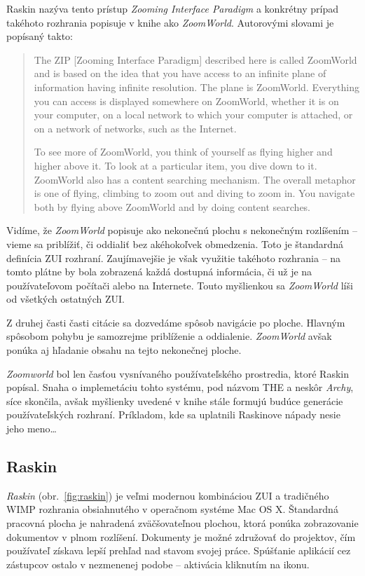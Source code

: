 Raskin nazýva tento prístup \textit{Zooming Interface Paradigm} a konkrétny prípad takéhoto rozhrania popisuje v knihe ako \textit{ZoomWorld}. Autorovými slovami je popísaný takto:

\begin{quotation}
The ZIP [Zooming Interface Paradigm] described here is called ZoomWorld and is based on the idea that you have access to an infinite plane of information having infinite resolution. The plane is ZoomWorld. Everything you can access is displayed somewhere on ZoomWorld, whether it is on your computer, on a local network to which your computer is attached, or on a network of networks, such as the Internet.

To see more of ZoomWorld, you think of yourself as flying higher and higher above it. To look at a particular item, you dive down to it. ZoomWorld also has a content searching mechanism. The overall metaphor is one of flying, climbing to zoom out and diving to zoom in. You navigate both by flying above ZoomWorld and by doing content searches.
\end{quotation}

Vidíme, že \textit{ZoomWorld} popisuje ako nekonečnú plochu s nekonečným rozlíšením -- vieme sa priblížiť, či oddialiť bez akéhokoľvek obmedzenia. Toto je štandardná definícia ZUI rozhraní. Zaujímavejšie je však využitie takéhoto rozhrania -- na tomto plátne by bola zobrazená každá dostupná informácia, či už je na používateľovom počítači alebo na Internete. Touto myšlienkou sa \textit{ZoomWorld} líši od všetkých ostatných ZUI.

Z druhej časti časti citácie sa dozvedáme spôsob navigácie po ploche. Hlavným spôsobom pohybu je samozrejme priblíženie a oddialenie. \textit{ZoomWorld} avšak ponúka aj hľadanie obsahu na tejto nekonečnej ploche.

\textit{Zoomworld} bol len časťou vysnívaného používateľského prostredia, ktoré Raskin popísal. Snaha o implemetáciu tohto systému, pod názvom THE a neskôr \textit{Archy}, síce skončila, avšak myšlienky uvedené v knihe stále formujú budúce generácie používateľských rozhraní. Príkladom, kde sa uplatnili Raskinove nápady nesie jeho meno\dots

\subsection{Raskin}

\textit{Raskin} (obr.~\ref{fig:raskin}) je veľmi modernou kombináciou ZUI a tradičného WIMP rozhrania obsiahnutého v operačnom systéme Mac OS X. Štandardná pracovná plocha je nahradená zväčšovateľnou plochou, ktorá ponúka zobrazovanie dokumentov v plnom rozlíšení. Dokumenty je možné združovať do projektov, čím používateľ získava lepší prehľad nad stavom svojej práce. Spúšťanie aplikácií cez zástupcov ostalo v nezmenenej podobe -- aktivácia kliknutím na ikonu.

